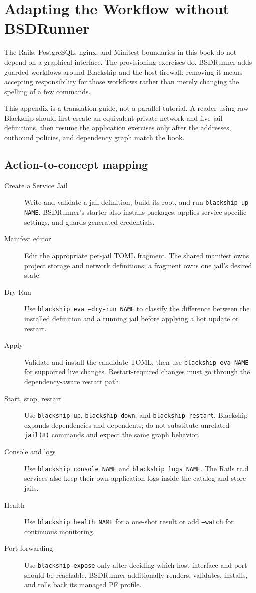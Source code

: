 \chapter{Adapting the Workflow without BSDRunner}

The Rails, PostgreSQL, nginx, and Minitest boundaries in this book do not
depend on a graphical interface. The provisioning exercises do. BSDRunner
adds guarded workflows around Blackship and the host firewall; removing it
means accepting responsibility for those workflows rather than merely changing
the spelling of a few commands.

This appendix is a translation guide, not a parallel tutorial. A reader using
raw Blackship should first create an equivalent private network and five jail
definitions, then resume the application exercises only after the addresses,
outbound policies, and dependency graph match the book.

\section{Action-to-concept mapping}

\begin{description}
  \item[Create a Service Jail] Write and validate a jail definition, build its
    root, and run \texttt{blackship up NAME}. BSDRunner's starter also installs
    packages, applies service-specific settings, and guards generated
    credentials.
  \item[Manifest editor] Edit the appropriate per-jail TOML fragment. The
    shared manifest owns project storage and network definitions; a fragment
    owns one jail's desired state.
  \item[Dry Run] Use \texttt{blackship eva --dry-run NAME} to classify the
    difference between the installed definition and a running jail before
    applying a hot update or restart.
  \item[Apply] Validate and install the candidate TOML, then use
    \texttt{blackship eva NAME} for supported live changes. Restart-required
    changes must go through the dependency-aware restart path.
  \item[Start, stop, restart] Use \texttt{blackship up},
    \texttt{blackship down}, and \texttt{blackship restart}. Blackship expands
    dependencies and dependents; do not substitute unrelated \texttt{jail(8)}
    commands and expect the same graph behavior.
  \item[Console and logs] Use \texttt{blackship console NAME} and
    \texttt{blackship logs NAME}. The Rails rc.d services also keep their own
    application logs inside the catalog and store jails.
  \item[Health] Use \texttt{blackship health NAME} for a one-shot result or
    add \texttt{--watch} for continuous monitoring.
  \item[Port forwarding] Use \texttt{blackship expose} only after deciding
    which host interface and port should be reachable. BSDRunner additionally
    renders, validates, installs, and rolls back its managed PF profile.
\end{description}

